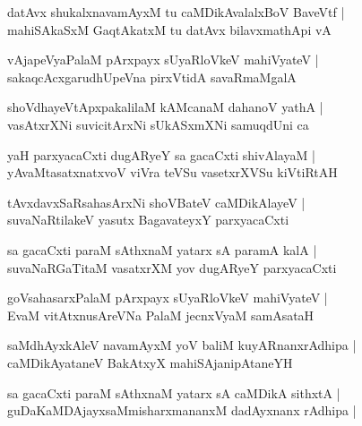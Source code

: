 \documentclass[twoside,12pt,openright]{book}
\newcounter{shloka}[chapter]
\begin{document}
\begin{shloka}%
datAvx shukalxnavamAyxM tu caMDikAvalalxBoV BaveVtf |\\
mahiSAkaSxM GaqtAkatxM tu datAvx bilavxmathApi vA 
\end{shloka}

\begin{shloka}%
vAjapeVyaPalaM pArxpayx sUyaRloVkeV mahiVyateV |\\
sakaqcAcxgarudhUpeVna pirxVtidA savaRmaMgalA 
\end{shloka}

\begin{shloka}%
shoVdhayeVtApxpakalilaM kAMcanaM dahanoV yathA |\\
vasAtxrXNi suvicitArxNi sUkASxmXNi samuqdUni ca 
\end{shloka}

\begin{shloka}%
yaH parxyacaCxti dugARyeY sa  gacaCxti shivAlayaM |\\
yAvaMtasatxnatxvoV viVra teVSu vasetxrXVSu kiVtiRtAH 
\end{shloka}

\begin{shloka}%
tAvxdavxSaRsahasArxNi shoVBateV caMDikAlayeV |\\
suvaNaRtilakeV yasutx BagavateyxY parxyacaCxti 
\end{shloka}

\begin{shloka}%
sa gacaCxti paraM sAthxnaM yatarx sA paramA kalA |\\
suvaNaRGaTitaM vasatxrXM yov dugARyeY parxyacaCxti 
\end{shloka}

\begin{shloka}%
goVsahasarxPalaM pArxpayx sUyaRloVkeV mahiVyateV |\\
EvaM vitAtxnusAreVNa PalaM jecnxVyaM samAsataH 
\end{shloka}

\begin{shloka}%
saMdhAyxkAleV navamAyxM yoV baliM kuyARnanxrAdhipa |\\
caMDikAyataneV BakAtxyX mahiSAjanipAtaneYH 
\end{shloka}

\begin{shloka}%
sa gacaCxti paraM sAthxnaM yatarx sA caMDikA sithxtA |\\
guDaKaMDAjayxsaMmisharxmananxM dadAyxnanx rAdhipa |
\end{shloka}
\end{document}
